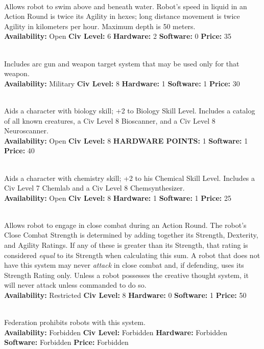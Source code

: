 \\
Allows robot to swim above and beneath water. Robot's speed in liquid
in an Action Round is twice its Agility in hexes; long distance
movement is twice Agility in kilometers per
hour. Maximum depth is 50 meters.\\
\textbf{Availability:} Open \textbf{Civ Level:} 6 \textbf{Hardware:} 2
\textbf{Software:} 0 \textbf{Price:} 35

\\
Includes arc gun and weapon target system
that may be used only for that weapon.\\
\textbf{Availability:} Military \textbf{Civ Level:} 8 \textbf{Hardware:}
1 \textbf{Software:} 1 \textbf{Price:} 30

\\
Aids a character with biology skill; +2 to Biology Skill Level.
Includes a catalog of all known creatures, a Civ Level 8 Bioscanner,
and  a Civ Level 8 Neuroscanner. \\
\textbf{Availability:} Open \textbf{Civ Level:} 8 \textbf{HARDWARE
  POINTS:} 1 \textbf{Software:} 1 \textbf{Price:} 40  

\\
Aids a character with chemistry skill; +2 to his Chemical Skill
Level. Includes a Civ Level 7 Chemlab and a Civ Level 8  
Chemsynthesizer. \\
\textbf{Availability:} Open \textbf{Civ Level:} 8 \textbf{Hardware:} 1 \textbf{Software:} 1 \textbf{Price:} 25 

\\
Allows robot to engage in close combat during an Action Round. The
robot's Close Combat Strength is determined by adding together its
Strength, Dexterity, and Agility Ratings. If any of these is greater
than its Strength, that rating is considered \emph{equal} to its Strength
when calculating this sum. A robot that does not have this system
may never \emph{attack} in close combat and, if defending, uses its Strength
Rating only. Unless a robot possesses the creative thought system, it
will never attack unless commanded to do so.\\
\textbf{Availability:} Restricted \textbf{Civ Level:} 8
\textbf{Hardware:} 0 \textbf{Software:} 1
\textbf{Price:} 50  

\\
Federation prohibits robots with this system. \\
\textbf{Availability:} Forbidden \textbf{Civ Level:} Forbidden \textbf{Hardware:} Forbidden \textbf{Software:} Forbidden \textbf{Price:} 
Forbidden 

